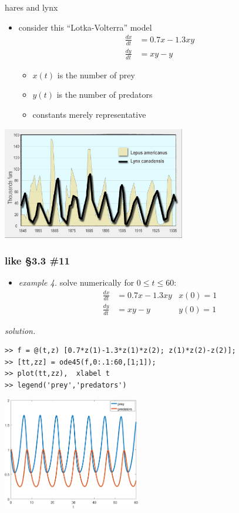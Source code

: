 \documentclass[dvipsnames,colorlinks]{beamer}
\begin{document}
\begin{frame}{hares and lynx}

\begin{itemize}
\item consider this ``Lotka-Volterra'' model
\begin{align*}
\frac{dx}{dt} &= 0.7 x - 1.3 xy \\
\frac{dy}{dt} &= xy - y
\end{align*}

\vspace{-2mm}
    \begin{itemize}
    \item $x(t)$ is the number of prey
    \item $y(t)$ is the number of predators
    \item constants merely representative
    \end{itemize}
\end{itemize}

\bigskip
\hfill \includegraphics[width=0.6\textwidth]{figs/hares-lynx}
\end{frame}


\begin{frame}[fragile]
\frametitle{like \S3.3 \#11}

\begin{itemize}
\item \emph{example 4.}  solve numerically for $0\le t\le 60$:
\begin{align*}
\frac{dx}{dt} &= 0.7 x - 1.3 xy & x(0)=1\\
\frac{dy}{dt} &= xy - y  & y(0)=1
\end{align*}
\end{itemize}

\vspace{-2mm}
\noindent \emph{solution.}
\begin{Verbatim}[fontsize=\small]
>> f = @(t,z) [0.7*z(1)-1.3*z(1)*z(2); z(1)*z(2)-z(2)];
>> [tt,zz] = ode45(f,0:.1:60,[1;1]);
>> plot(tt,zz),  xlabel t
>> legend('prey','predators')
\end{Verbatim}


\vspace{-7mm}
\hfill \includegraphics[width=0.45\textwidth]{figs/lotka-time}
\end{frame}
\end{document}
